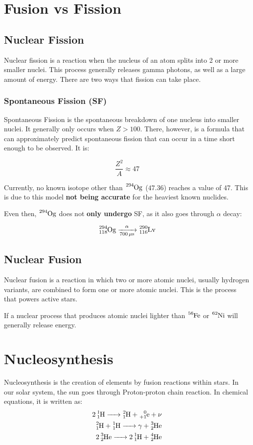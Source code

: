 \documentclass{article}
\begin{document}
\begin{multicols*}{2}
    \section{Fusion vs Fission}
    \subsection{Nuclear Fission}
    Nuclear fission is a reaction when the nucleus of an atom splits into 2
    or more smaller nuclei. This process generally releases gamma photons,
    as well as a large amount of energy. There are two ways that fission can
    take place.

    \subsubsection{Spontaneous Fission (SF)}
    Spontaneous Fission is the spontaneous breakdown of one nucleus into
    smaller nuclei. It generally only occurs when $Z > 100$. There, however,
    is a formula that can approximately predict spontaneous fission that can
    occur in a time short enough to be observed. It is:

    \[
      \frac{Z^2}{A} \approx 47
    \]

    Currently, no known isotope other than $\ce{^{294}Og}$ ($47.36$)
    reaches a value of 47. This is due to this model \textbf{not being accurate}
    for the heaviest known nuclides.

    Even then, $\ce{^{294}Og}$ does not \textbf{only undergo} SF, as it also
    goes through $\alpha$ decay:

    \[
      \ce{^{294}_{118}Og ->[\alpha][700 \mu{s}] ^{290}_{116}Lv}
    \]
    \subsection{Nuclear Fusion}
    Nuclear fusion is a reaction in which two or more atomic nuclei, usually
    hydrogen variants, are combined to form one or more atomic nuclei. This
    is the process that powers active stars.

    If a nuclear process that produces atomic nuclei lighter than $\ce{^{56}Fe}$
    or $\ce{^{62}Ni}$ will generally release energy.

    \section{Nucleosynthesis}
    Nucleosynthesis is the creation of elements by fusion reactions within
    stars. In our solar system, the sun goes through Proton-proton chain reaction.
    In chemical equations, it is written as:
    \begin{equation*}
      \begin{split}
        \ce{2 ^{1}_{1}H -> ^{2}_{1}H + ^0_{+1}e + \nu}      \\
        \ce{^{2}_{1}H + ^{1}_{1}H -> \gamma{} + ^{3}_{2}He} \\
        \ce{2 ^{3}_{2}He -> 2 ^{1}_{1}H + ^{4}_{2}He}       \\
      \end{split}
    \end{equation*}


\end{multicols*}
\end{document}
